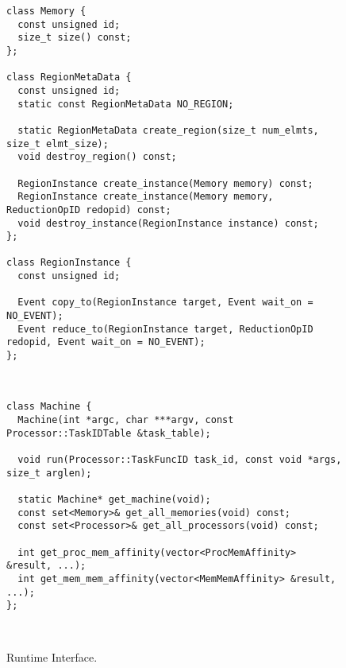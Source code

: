 \begin{figure}
\begin{lrbox}{\mylistingbox}
\begin{lstlisting}[firstnumber=39]
class Memory {
  const unsigned id;
  size_t size() const;
};

class RegionMetaData {
  const unsigned id;
  static const RegionMetaData NO_REGION;

  static RegionMetaData create_region(size_t num_elmts, size_t elmt_size);
  void destroy_region() const;

  RegionInstance create_instance(Memory memory) const;
  RegionInstance create_instance(Memory memory, ReductionOpID redopid) const;
  void destroy_instance(RegionInstance instance) const;
};

class RegionInstance {
  const unsigned id;

  Event copy_to(RegionInstance target, Event wait_on = NO_EVENT);
  Event reduce_to(RegionInstance target, ReductionOpID redopid, Event wait_on = NO_EVENT);
};
\end{lstlisting}
\end{lrbox}
\subfigure{\usebox{\mylistingbox}} \\

\begin{lrbox}{\mylistingbox}
\begin{lstlisting}[firstnumber=62]
class Machine {
  Machine(int *argc, char ***argv, const Processor::TaskIDTable &task_table);

  void run(Processor::TaskFuncID task_id, const void *args, size_t arglen);

  static Machine* get_machine(void);
  const set<Memory>& get_all_memories(void) const;
  const set<Processor>& get_all_processors(void) const;

  int get_proc_mem_affinity(vector<ProcMemAffinity> &result, ...);
  int get_mem_mem_affinity(vector<MemMemAffinity> &result, ...);
};
\end{lstlisting}
\end{lrbox}
\subfigure{\usebox{\mylistingbox}} \\

\caption{Runtime Interface.\label{fig:runtimeapi}}
\vspace{-4mm}
\end{figure}

